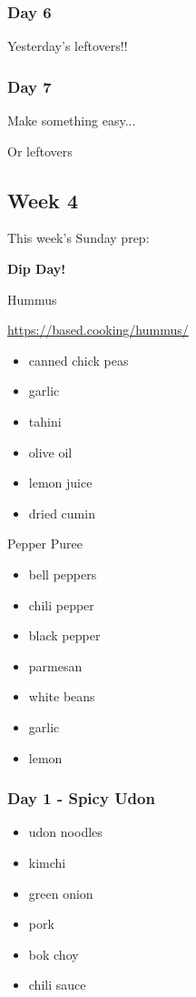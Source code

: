 \documentclass[11pt, a4paper]{article}
\begin{document}
\subsubsection{Day 6}
\vspace{1pc}
Yesterday's leftovers!!

\subsubsection{Day 7}
\vspace{1pc}
\noindent Make something easy...
\par
Or leftovers


\vspace{0.917 pc} %


\pagebreak
\subsection{Week 4}

This week's Sunday prep:
\par
\vspace{1pc}
\noindent\textbf{Dip Day!}
\par
Hummus
\par
\small{\url{https://based.cooking/hummus/}}
\par
\begin{itemize}
\item canned chick peas
\item garlic
\item tahini
\item olive oil
\item lemon juice
\item dried cumin
\end{itemize}

\vspace{1pc}

Pepper Puree
\begin{itemize}
\item bell peppers
\item chili pepper
\item black pepper
\item parmesan 
\item white beans
\item garlic
\item lemon 
\end{itemize}

\subsubsection{Day 1 - Spicy Udon}
\vspace{1pc}
\begin{itemize}
\item udon noodles
\item kimchi
\item green onion 
\item pork
\item bok choy
\item chili sauce
\end{itemize}
\end{document}
